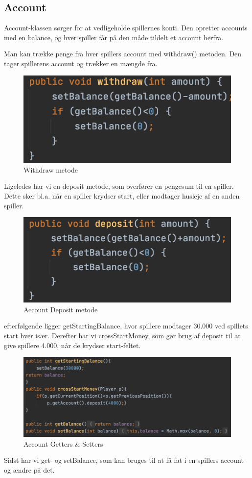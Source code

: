 \subsection{Account}

Account-klassen sørger for at vedligeholde spillernes konti. Den opretter accounts med en balance, og hver spiller får på den måde tildelt et account herfra.

Man kan trække penge fra hver spillers account med withdraw() metoden. Den tager spillerens account og trækker en mængde fra.
\begin{figure}[H]
    \centering
    \includegraphics[width=\textwidth]{sources/7_implementering/Withdraw.PNG}
    \caption{Withdraw metode}
    \label{fig:accWithdraw}
\end{figure}
Ligeledes har vi en deposit metode, som overfører en pengesum til en spiller. Dette sker bl.a. når en spiller krydser start, eller modtager husleje af en anden spiller.
\begin{figure}[H]
    \centering
    \includegraphics[width=\textwidth]{sources/7_implementering/Account Deposit.png}
    \caption{Account Deposit metode}
    \label{fig:accDeposit}
\end{figure}
efterfølgende ligger getStartingBalance, hvor spillere modtager 30.000 ved spillets start hver især. 
Derefter har vi crossStartMoney, som gør brug af deposit til at give spillere 4.000, når de krydser start-feltet.
\begin{figure}[H]
    \centering
    \includegraphics[width=\textwidth]{sources/7_implementering/Account GetSet.png}
    \caption{Account Getters & Setters}
    \label{fig:accGetSet}
\end{figure}
Sidst har vi get- og setBalance, som kan bruges til at få fat i en spillers account og ændre på det.


